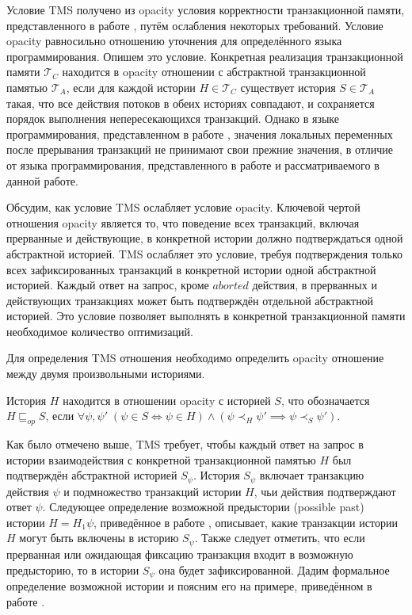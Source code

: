 Условие TMS получено из opacity условия корректности транзакционной памяти, представленного в работе \cite{opacity_article}, путём ослабления некоторых требований. Условие opacity равносильно отношению уточнения для определённого языка программирования. Опишем это условие. Конкретная реализация транзакционной памяти $\mathcal{T}_C$ находится в opacity отношении с абстрактной транзакционной памятью $\mathcal{T}_A$, если для каждой истории $H \in \mathcal{T}_C$ существует история $S \in \mathcal{T}_A$ такая, что все действия потоков в обеих историях совпадают, и сохраняется порядок выполнения непересекающихся транзакций. Однако в языке программирования, представленном в работе \cite{opacity_article}, значения локальных переменных после прерывания транзакций не принимают свои прежние значения, в отличие от языка программирования, представленного в работе \cite{tms_article} и рассматриваемого в данной работе. 

Обсудим, как условие TMS ослабляет условие opacity. Ключевой чертой отношения opacity является то, что поведение всех транзакций, включая прерванные и действующие, в конкретной истории должно подтверждаться одной абстрактной историей. TMS ослабляет это условие, требуя подтверждения только всех зафиксированных транзакций в конкретной истории одной абстрактной историей. Каждый ответ на запрос, кроме $aborted$ действия, в прерванных и действующих транзакциях может быть подтверждён отдельной абстрактной историей. Это условие позволяет выполнять в конкретной транзакционной памяти необходимое количество оптимизаций. 

Для определения TMS отношения необходимо определить opacity отношение между двумя произвольными историями. 

\begin{mydefinition}\label{opacity}
История $H$ находится в отношении opacity с историей $S$, что обозначается $H \sqsubseteq_{op} S$, если $\forall \psi, \psi' \; (\psi \in S \iff \psi \in H ) \land (\psi \prec_H \psi' \implies \psi \prec_S \psi' ).$
\end{mydefinition}

Как было отмечено выше, TMS требует, чтобы каждый ответ на запрос в истории взаимодействия с конкретной транзакционной памятью $H$ был подтверждён абстрактной историей $S_{\psi}$. История $S_{\psi}$ включает транзакцию действия $\psi$ и подмножество транзакций истории $H$, чьи действия подтверждают ответ $\psi$. Следующее определение возможной предыстории (possible past) истории $H = H_1\psi$, приведённое в работе \cite{tms_article}, описывает, какие транзакции истории $H$ могут быть включены в историю $S_{\psi}$. Также следует отметить, что если прерванная или ожидающая фиксацию транзакция входит в возможную предысторию, то в истории $S_{\psi}$ она будет зафиксированной. Дадим формальное определение возможной истории и поясним его на примере, приведённом в работе \cite{tms_article}.

